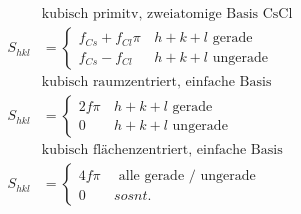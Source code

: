\begin{equation*}
    \begin{aligned}
        &\text{kubisch primitv, zweiatomige Basis CsCl} \\
        S_{hkl} &= \begin{cases}
            f_{Cs} + f_{Cl} \pi & \, h+k+l \text{ gerade} \\
            f_{Cs} - f_{Cl} & \, h+k+l \text{ ungerade}
            \end{cases} \\
        &\text{kubisch raumzentriert, einfache Basis} \\
        S_{hkl} &= \begin{cases}
            2f \pi & \, h+k+l \text{ gerade} \\
            0 & \, h+k+l \text{ ungerade}
            \end{cases} \\
        &\text{kubisch flächenzentriert, einfache Basis} \\
        S_{hkl} &= \begin{cases}
            4f \pi & \, \text{ alle gerade / ungerade} \\
            0 & \, sosnt.
            \end{cases}
    \end{aligned}
\end{equation*}